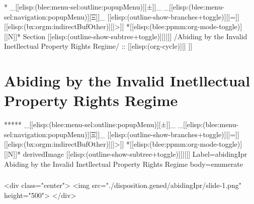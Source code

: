
\begin{whenOrg}
*  _[[elisp:(blee:menu-sel:outline:popupMenu)][±]]_ _[[elisp:(blee:menu-sel:navigation:popupMenu)][Ξ]]_ [[elisp:(outline-show-branches+toggle)][|=]] [[elisp:(bx:orgm:indirectBufOther)][|>]] *[[elisp:(blee:ppmm:org-mode-toggle)][|N]]*  Section    [[elisp:(outline-show-subtree+toggle)][||]]   /Abiding by the Invalid Inetllectual Property Rights Regime/ ::  [[elisp:(org-cycle)][| ]]
\end{whenOrg}

\section{Abiding by the Invalid Inetllectual Property Rights Regime}


\begin{whenOrg}
*****  _[[elisp:(blee:menu-sel:outline:popupMenu)][±]]_ _[[elisp:(blee:menu-sel:navigation:popupMenu)][Ξ]]_ [[elisp:(outline-show-branches+toggle)][|=]] [[elisp:(bx:orgm:indirectBufOther)][|>]] *[[elisp:(blee:ppmm:org-mode-toggle)][|N]]*  derivedImage [[elisp:(outline-show-subtree+toggle)][||]] Label=abidingIpr Abiding by the Invalid Inetllectual Property Rights Regime body=enumerate
\end{whenOrg}

\begin{htmlonly}

\begin{frame}[fragile,plain,label=abidingIpr]
    \frametitle{}
    \framesubtitle{}
    \begin{rawhtml}
<div class="center">
<img src="./disposition.gened/abidingIpr/slide-1.png" height="500">
</div>
    \end{rawhtml}
\end{frame}
\end{htmlonly}

